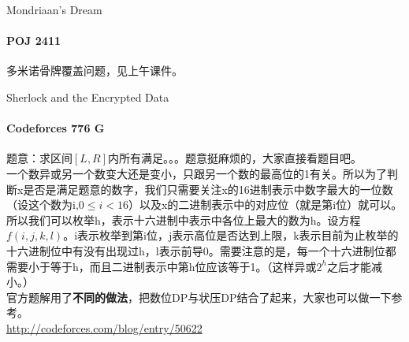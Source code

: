 \documentclass[hyperref={unicode=true}]{beamer}
\theoremstyle{definition}
\theoremstyle{proof}
\begin{document}
\begin{frame}{Mondriaan's Dream}
  \framesubtitle{POJ 2411}
  多米诺骨牌覆盖问题，见上午课件。
\end{frame}

\begin{frame}{Sherlock and the Encrypted Data}
  \framesubtitle{Codeforces 776 G}
  题意：求区间$[L,R]$内所有满足。。。题意挺麻烦的，大家直接看题目吧。\\
  一个数异或另一个数变大还是变小，只跟另一个数的最高位的1有关。所以为了判断x是否是满足题意的数字，我们只需要关注x的16进制表示中数字最大的一位数（设这个数为i,$0 \leq i < 16$）以及x的二进制表示中的对应位（就是第i位）就可以。\\
  所以我们可以枚举h，表示十六进制中表示中各位上最大的数为h。设方程$f(i,j,k,l)$。i表示枚举到第i位，j表示高位是否达到上限，k表示目前为止枚举的十六进制位中有没有出现过h，l表示前导0。需要注意的是，每一个十六进制位都需要小于等于h，而且二进制表示中第h位应该等于1。（这样异或$2^h$之后才能减小。）\\
  官方题解用了{\bf 不同的做法}，把数位DP与状压DP结合了起来，大家也可以做一下参考。\\
  \url{http://codeforces.com/blog/entry/50622}
\end{frame}
\end{document}

